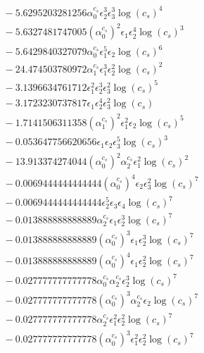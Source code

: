 \documentclass[10pt]{article}
\begin{document}
\begin{align*}
&{}  - 5.6295203281256 \alpha_{0}^{c_s} \epsilon_{2}^{3} \epsilon_{3}^{3} \log{\left(c_{s} \right)}^{4} \\
&{}  - 5.6327481747005 \left(\alpha_{0}^{c_s}\right)^{2} \epsilon_{1} \epsilon_{2}^{4} \log{\left(c_{s} \right)}^{3} \\
&{}  - 5.6429840327079 \alpha_{0}^{c_s} \epsilon_{1}^{5} \epsilon_{2} \log{\left(c_{s} \right)}^{6} \\
&{}  - 24.474503780972 \alpha_{1}^{c_s} \epsilon_{1}^{3} \epsilon_{2}^{2} \log{\left(c_{s} \right)}^{2} \\
&{}  - 3.1396634761712 \epsilon_{1}^{2} \epsilon_{2}^{3} \epsilon_{3}^{2} \log{\left(c_{s} \right)}^{5} \\
&{}  - 3.1723230737817 \epsilon_{1} \epsilon_{2}^{4} \epsilon_{3}^{2} \log{\left(c_{s} \right)} \\
&{}  - 1.7141506311358 \left(\alpha_{1}^{c_s}\right)^{2} \epsilon_{1}^{2} \epsilon_{2} \log{\left(c_{s} \right)}^{5} \\
&{}  - 0.053647756620656 \epsilon_{1} \epsilon_{2} \epsilon_{3}^{5} \log{\left(c_{s} \right)}^{3} \\
&{}  - 13.913374274044 \left(\alpha_{0}^{c_s}\right)^{2} \alpha_{2}^{c_s} \epsilon_{1}^{2} \log{\left(c_{s} \right)}^{2} \\
&{}  - 0.0069444444444444 \left(\alpha_{0}^{c_s}\right)^{4} \epsilon_{2} \epsilon_{3}^{2} \log{\left(c_{s} \right)}^{7} \\
&{}  - 0.0069444444444444 \epsilon_{2}^{5} \epsilon_{3} \epsilon_{4} \log{\left(c_{s} \right)}^{7} \\
&{}  - 0.013888888888889 \alpha_{2}^{c_s} \epsilon_{1} \epsilon_{2}^{3} \log{\left(c_{s} \right)}^{7} \\
&{}  - 0.013888888888889 \left(\alpha_{0}^{c_s}\right)^{3} \epsilon_{1} \epsilon_{2}^{3} \log{\left(c_{s} \right)}^{7} \\
&{}  - 0.013888888888889 \left(\alpha_{0}^{c_s}\right)^{4} \epsilon_{1} \epsilon_{2}^{2} \log{\left(c_{s} \right)}^{7} \\
&{}  - 0.027777777777778 \alpha_{0}^{c_s} \alpha_{2}^{c_s} \epsilon_{2}^{3} \log{\left(c_{s} \right)}^{7} \\
&{}  - 0.027777777777778 \left(\alpha_{0}^{c_s}\right)^{3} \alpha_{2}^{c_s} \epsilon_{2} \log{\left(c_{s} \right)}^{7} \\
&{}  - 0.027777777777778 \alpha_{2}^{c_s} \epsilon_{1}^{2} \epsilon_{2}^{2} \log{\left(c_{s} \right)}^{7} \\
&{}  - 0.027777777777778 \left(\alpha_{0}^{c_s}\right)^{3} \epsilon_{1}^{2} \epsilon_{2}^{2} \log{\left(c_{s} \right)}^{7} \\

\end{align*}
\end{document}

